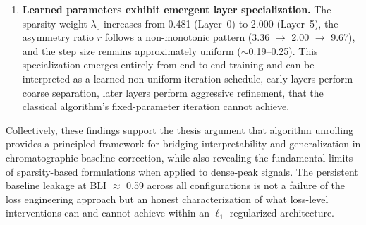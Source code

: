 \begin{enumerate}
    \item \textbf{Learned parameters exhibit emergent layer specialization.} The sparsity weight $\lambda_0$ increases from 0.481 (Layer~0) to 2.000 (Layer~5), the asymmetry ratio $r$ follows a non-monotonic pattern (3.36 $\to$ 2.00 $\to$ 9.67), and the step size remains approximately uniform (${\sim}$0.19--0.25). This specialization emerges entirely from end-to-end training and can be interpreted as a learned non-uniform iteration schedule, early layers perform coarse separation, later layers perform aggressive refinement, that the classical algorithm's fixed-parameter iteration cannot achieve.
\end{enumerate}

Collectively, these findings support the thesis argument that algorithm unrolling provides a principled framework for bridging interpretability and generalization in chromatographic baseline correction, while also revealing the fundamental limits of sparsity-based formulations when applied to dense-peak signals. The persistent baseline leakage at BLI $\approx$ 0.59 across all configurations is not a failure of the loss engineering approach but an honest characterization of what loss-level interventions can and cannot achieve within an $\ell_1$-regularized architecture.
